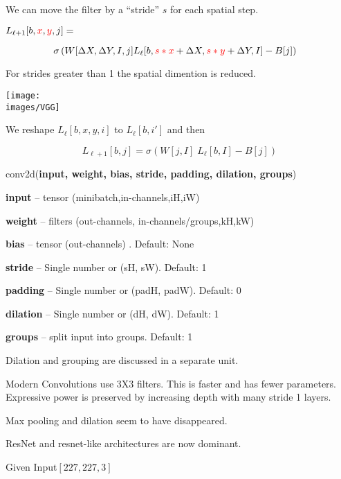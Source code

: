 {We can move the filter by a ``stride'' $s$ for each spatial step.

\vfill
$L_{{\ell+1}}[b,{\color{red}x},{\color{red}y},j] =$

$$\hspace{-1em}\sigma\left(W[\Delta X, \Delta Y, I, j] L_{{\ell}}[b,{\color{red} s*x} + \Delta X, {\color{red} s*y} + \Delta Y, I] - B[j]\right)$$

\vfill
For strides greater than 1 the spatial dimention is reduced.



\centerline{\texttt{[image: \\images/VGG]}}



We reshape $L_{{\ell}}[b,x,y,i]$ to $L_{{\ell}}[b,i']$ and then

\vfill
$$L_{{\ell+1}}[b,j] = \sigma\left(W[j,I]\;L_{{\ell}}[b,I] - B[j]\right)$$


conv2d({\bf input, weight, bias, stride, padding, dilation, groups})

\bigskip
{\bf input} – tensor (minibatch,in-channels,iH,iW)

\medskip
{\bf weight} – filters (out-channels, in-channels/groups,kH,kW)

\medskip
{\bf bias} – tensor (out-channels) . Default: None

\medskip
{\bf stride} – Single number or (sH, sW). Default: 1

\medskip
{\bf padding} – Single number or (padH, padW). Default: 0

\medskip
{\bf dilation} – Single number or (dH, dW). Default: 1

\medskip
{\bf groups} – split input into groups. Default: 1

\vfill
Dilation and grouping are discussed in a separate unit.


Modern Convolutions use 3X3 filters.  This is faster and has fewer parameters.  Expressive power is preserved by increasing depth with many stride 1 layers.

\vfill
Max pooling and dilation seem to have disappeared.

\vfill
ResNet and resnet-like architectures are now dominant.

{\huge
\centerline{Given Input$[227,227,3]$}

}}
